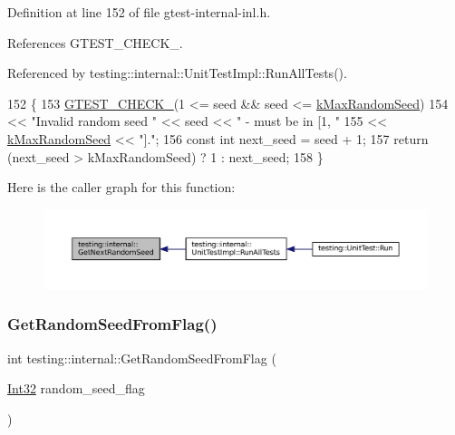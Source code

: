 Definition at line 152 of file gtest-\/internal-\/inl.\+h.



References G\+T\+E\+S\+T\+\_\+\+C\+H\+E\+C\+K\+\_\+.



Referenced by testing\+::internal\+::\+Unit\+Test\+Impl\+::\+Run\+All\+Tests().


\begin{DoxyCode}
152                                        \{
153   \hyperlink{gtest-port_8h_ab54343f0a36dc4cb0ce8a478dd7847b8}{GTEST\_CHECK\_}(1 <= seed && seed <= \hyperlink{namespacetesting_1_1internal_a41bd421ace53d23dbe85d9618c3afaee}{kMaxRandomSeed})
154       << \textcolor{stringliteral}{"Invalid random seed "} << seed << \textcolor{stringliteral}{" - must be in [1, "}
155       << \hyperlink{namespacetesting_1_1internal_a41bd421ace53d23dbe85d9618c3afaee}{kMaxRandomSeed} << \textcolor{stringliteral}{"]."};
156   \textcolor{keyword}{const} \textcolor{keywordtype}{int} next\_seed = seed + 1;
157   \textcolor{keywordflow}{return} (next\_seed > kMaxRandomSeed) ? 1 : next\_seed;
158 \}
\end{DoxyCode}
Here is the caller graph for this function\+:
\nopagebreak
\begin{figure}[H]
\begin{center}
\leavevmode
\includegraphics[width=350pt]{namespacetesting_1_1internal_a6e07a655cb987d131cd8fbeba9a7f1eb_icgraph}
\end{center}
\end{figure}
\mbox{\label{namespacetesting_1_1internal_ae74fedbdaebaac8d1202192266243b9e}} 
\subsubsection{\texorpdfstring{Get\+Random\+Seed\+From\+Flag()}{GetRandomSeedFromFlag()}}
{\footnotesize\ttfamily int testing\+::internal\+::\+Get\+Random\+Seed\+From\+Flag (\begin{DoxyParamCaption}\item[{\hyperlink{namespacetesting_1_1internal_a8ee38faaf875f133358abaf9bc056cec}{Int32}}]{random\+\_\+seed\+\_\+flag }\end{DoxyParamCaption})\hspace{0.3cm}{\ttfamily [inline]}}



